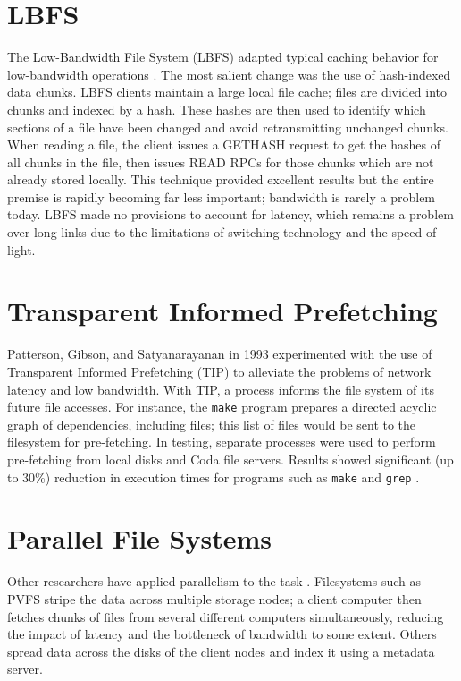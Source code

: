 \documentclass[11pt,american]{report}
\begin{document}
\section{LBFS}
The Low-Bandwidth File System (LBFS) adapted typical caching behavior for low-bandwidth operations \cite{LBFS}. The most salient change was the use of hash-indexed data chunks. LBFS clients maintain a large local file cache; files are divided into chunks and indexed by a hash. These hashes are then used to identify which sections of a file have been changed and avoid retransmitting unchanged chunks. When reading a file, the client issues a GETHASH request to get the hashes of all chunks in the file, then issues READ RPCs for those chunks which are not already stored locally. This technique provided excellent results but the entire premise is rapidly becoming far less important; bandwidth is rarely a problem today. LBFS made no provisions to account for latency, which remains a problem over long links due to the limitations of switching technology and the speed of light.

\section{Transparent Informed Prefetching}
Patterson, Gibson, and Satyanarayanan in 1993 experimented with the use of Transparent Informed Prefetching (TIP) to alleviate the problems of network latency and low bandwidth. With TIP, a process informs the file system of its future file accesses. For instance, the {\tt make} program prepares a directed acyclic graph of dependencies, including files; this list of files would be sent to the filesystem for pre-fetching. In testing, separate processes were used to perform pre-fetching from local disks and Coda file servers. Results showed significant (up to 30\%) reduction in execution times for programs such as {\tt make} and {\tt grep} \cite{TIP}.

\section{Parallel File Systems}
Other researchers have applied parallelism to the task \cite{Lee01appliedtechniques,PVFS}. Filesystems such as PVFS stripe the data across multiple storage nodes; a client computer then fetches chunks of files from several different computers simultaneously, reducing the impact of latency and the bottleneck of bandwidth to some extent. Others \cite{NFSP} spread data across the disks of the client nodes and index it using a metadata server.
\end{document}
